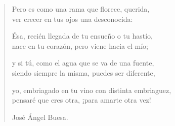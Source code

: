 \documentclass[11pt, portrait, twoside, notitlepage, openright]{book}
\begin{document}
\begin{verse}
Pero es como una rama que florece, querida,\\
ver crecer en tus ojos una desconocida:
\newline

Ésa, recién llegada de tu ensueño o tu hastío,\\
nace en tu corazón, pero viene hacia el mío;
\newline

y si tú, como el agua que se va de una fuente,\\
siendo siempre la misma, puedes ser diferente,
\newline

yo, embriagado en tu vino con distinta embriaguez,\\
pensaré que eres otra, ¡para amarte otra vez!
\newline

José Ángel Buesa.
\end{verse}
\end{document}
